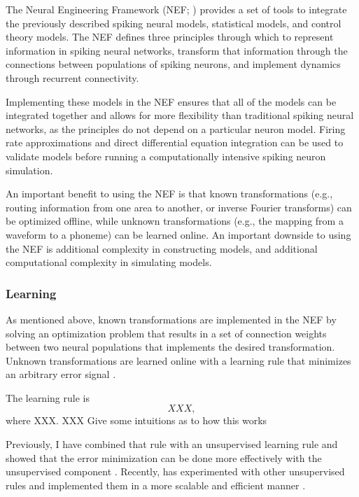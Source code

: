 \documentclass{article}
\begin{document}
The Neural Engineering Framework (NEF; \citealp{eliasmith2003})
provides a set of tools to integrate
the previously described
spiking neural models,
statistical models,
and control theory models.
The NEF defines three principles
through which to represent
information in spiking neural networks,
transform that information through the connections
between populations of spiking neurons,
and implement dynamics through
recurrent connectivity.

Implementing these models
in the NEF ensures that all
of the models can be integrated together
and allows for more flexibility
than traditional spiking neural networks,
as the principles do not depend
on a particular neuron model.
Firing rate approximations
and direct differential equation integration
can be used to validate models
before running a computationally intensive
spiking neuron simulation.

An important benefit to using the NEF
is that known transformations
(e.g., routing information from one area
to another, or inverse Fourier transforms)
can be optimized offline,
while unknown transformations
(e.g., the mapping from a waveform
to a phoneme)
can be learned online.
An important downside to using the NEF
is additional complexity
in constructing models,
and additional computational complexity
in simulating models.

\subsubsection{Learning}
\label{subsec:learning}

As mentioned above, known transformations
are implemented in the NEF by solving
an optimization problem
that results in a set of connection weights
between two neural populations
that implements the desired transformation.
Unknown transformations are learned
online with a learning rule
that minimizes an arbitrary error signal
\citep{macneil2011}.

The learning rule is
\begin{equation}
  XXX,
\end{equation}
where XXX.
XXX Give some intuitions as to how this works

Previously, I have combined that rule
with an unsupervised learning rule
and showed that the error minimization
can be done more effectively with
the unsupervised component
\citep{bekolay2013}.
Recently, \citeauthor{crawford-inpress}
has experimented
with other unsupervised rules
and implemented them
in a more scalable and efficient manner
\citep{crawford-inpress}.
\end{document}
